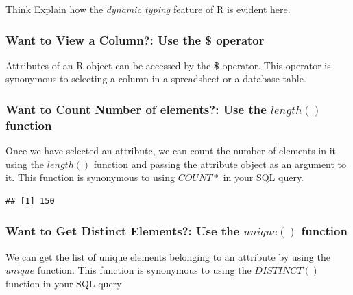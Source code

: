 \begin{DIY}{Think}
Explain how the \emph{dynamic typing} feature of R is evident here. 
\end{DIY}
\subsubsection{Want to View a Column?: Use the \textbf{\$} operator}
\noindent Attributes of an R object can be accessed by the \textbf{\$} operator. This operator is synonymous to selecting a column in a spreadsheet or a database table.
\begin{knitrout}
\color{fgcolor}\begin{kframe}
\begin{alltt}
\hlkwb{<-}\hlopt{$}
\end{alltt}
\end{kframe}
\end{knitrout}
\subsubsection{Want to Count Number of elements?: Use the $length()$ function}
\noindent Once we have selected an attribute, we can count the number of elements in it using the $length()$  function and passing the attribute object as an argument to it. This function is synonymous to using $COUNT*$ in your SQL query.
\begin{knitrout}
\color{fgcolor}\begin{kframe}
\begin{alltt}
\hlopt{$}
\end{alltt}
\begin{verbatim}
## [1] 150
\end{verbatim}
\end{kframe}
\end{knitrout}
\subsubsection{Want to Get Distinct Elements?: Use the $unique()$ function}
\noindent We can get the list of unique elements belonging to an attribute by using the $unique$ function. This function is synonymous to using the $DISTINCT()$ function in your SQL query  
\begin{knitrout}
\color{fgcolor}\begin{kframe}
\begin{alltt}
\hlopt{$}
\end{alltt}
\end{kframe}
\end{knitrout}
